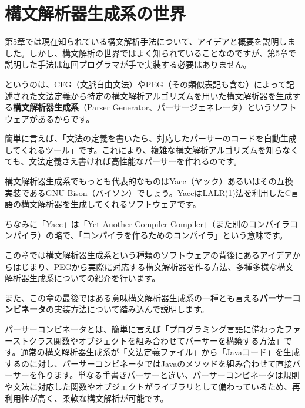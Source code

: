 \hypertarget{chapter6-ux69cbux6587ux89e3ux6790ux5668ux751fux6210ux7cfbux306eux4e16ux754c}{%
\chapter{構文解析器生成系の世界}\label{chapter6-ux69cbux6587ux89e3ux6790ux5668ux751fux6210ux7cfbux306eux4e16ux754c}}

第5章では現在知られている構文解析手法について、アイデアと概要を説明しました。しかし、構文解析の世界ではよく知られていることなのですが、第5章で説明した手法は毎回プログラマが手で実装する必要はありません。

というのは、CFG（文脈自由文法）やPEG（その類似表記も含む）によって記述された文法定義から特定の構文解析アルゴリズムを用いた構文解析器を生成する\textbf{構文解析器生成系}（Parser
Generator、パーサージェネレータ）というソフトウェアがあるからです。

簡単に言えば、「文法の定義を書いたら、対応したパーサーのコードを自動生成してくれるツール」です。これにより、複雑な構文解析アルゴリズムを知らなくても、文法定義さえ書ければ高性能なパーサーを作れるのです。

構文解析器生成系でもっとも代表的なものはYacc（ヤック）あるいはその互換実装であるGNU
Bison（バイソン）でしょう。YaccはLALR(1)法を利用したC言語の構文解析器を生成してくれるソフトウェアです。

ちなみに「Yacc」は「Yet Another Compiler
Compiler」（また別のコンパイラコンパイラ）の略で、「コンパイラを作るためのコンパイラ」という意味です。

この章では構文解析器生成系という種類のソフトウェアの背後にあるアイデアからはじまり、PEGから実際に対応する構文解析器を作る方法、多種多様な構文解析器生成系についての紹介を行います。

また、この章の最後ではある意味構文解析器生成系の一種とも言える\textbf{パーサーコンビネータ}の実装方法について踏み込んで説明します。

パーサーコンビネータとは、簡単に言えば「プログラミング言語に備わったファーストクラス関数やオブジェクトを組み合わせてパーサーを構築する方法」です。通常の構文解析器生成系が「文法定義ファイル」から「Javaコード」を生成するのに対し、パーサーコンビネータではJavaのメソッドを組み合わせて直接パーサーを作ります。単なる手書きパーサーと違い、パーサーコンビネータは規則や文法に対応した関数やオブジェクトがライブラリとして備わっているため、再利用性が高く、柔軟な構文解析が可能です。

